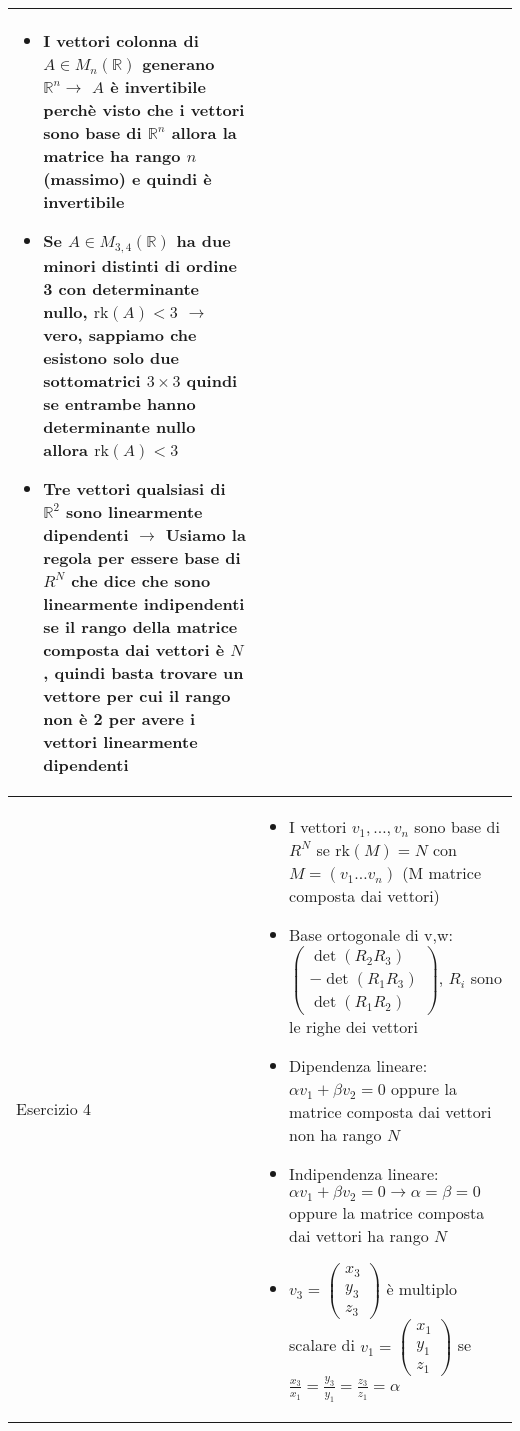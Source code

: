 \documentclass[10pt]{article}
\begin{document}
\begin{landscape}
\begin{minipage}[t]{0.49\textwidth}
\begin{tabular}{| m{2cm} | m{15cm} |}
\begin{itemize}
        \item I vettori colonna di $A\in M_{n}(\mathbb{R})$ generano $\mathbb{R}^{n}\rightarrow$ $A$ è invertibile perchè visto che i vettori sono base di $\mathbb{R}^{n}$ allora la matrice ha rango $n$(massimo) e quindi è invertibile
        \item Se $A\in M_{3,4}(\mathbb{R})$ ha due minori distinti di ordine 3 con determinante nullo, $\text{rk}(A)<3$ $\rightarrow$ vero, sappiamo che esistono solo due sottomatrici $3\times 3$ quindi se entrambe hanno determinante nullo allora $\text{rk}(A)<3$
        \item Tre vettori qualsiasi di $\mathbb{R}^{2}$ sono linearmente dipendenti $\rightarrow$ Usiamo la regola per essere base di $R^{N}$ che dice che sono linearmente indipendenti se il rango della matrice composta dai vettori è $N$, quindi basta trovare un vettore per cui il rango non è 2 per avere i vettori linearmente dipendenti  
    \end{itemize}\\
    \hline
    Esercizio 4 & \begin{itemize}
        \item I vettori $v_{1},\ldots ,v_{n}$ sono base di $R^{N}$ se $\text{rk}(M)=N$ con $M=(v_{1}\ldots v_{n})$ (M matrice composta dai vettori)
        \item Base ortogonale di v,w: $\begin{pmatrix}
            \det(R_{2}R_{3}) \\
            -\det(R_{1}R_{3}) \\
            \det(R_{1}R_{2})
        \end{pmatrix}$, $R_{i}$ sono le righe dei vettori
        \item Dipendenza lineare: $\alpha v_{1}+\beta v_{2} = 0$ oppure la matrice composta dai vettori non ha rango $N$
        \item Indipendenza lineare: $\alpha v_{1}+\beta v_{2} = 0 \rightarrow \alpha = \beta = 0$ oppure la matrice composta dai vettori ha rango $N$
        \item $v_{3}=\begin{pmatrix}
            x_{3} \\ y_{3} \\ z_{3}
        \end{pmatrix}$ è multiplo scalare di $v_{1}=\begin{pmatrix}
            x_{1} \\ y_{1} \\ z_{1}
        \end{pmatrix}$ se $\frac{x_{3}}{x_{1}}=\frac{y_{3}}{y_{1}}=\frac{z_{3}}{z_{1}}=\alpha$

\end{itemize}
\end{tabular}
\end{minipage}
\end{landscape}
\end{document}
